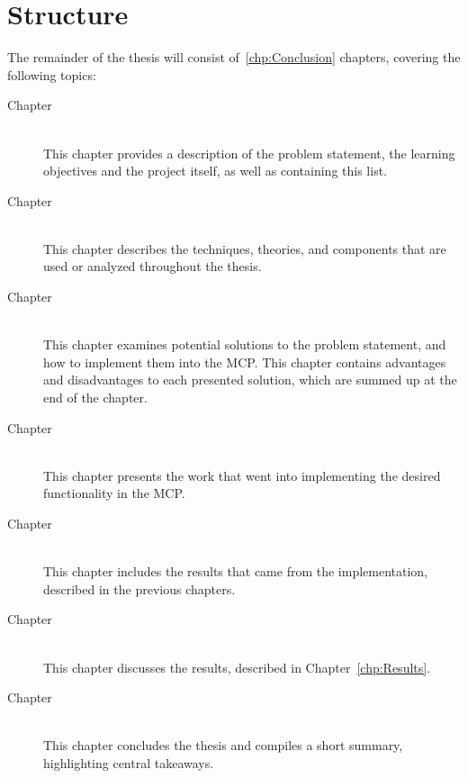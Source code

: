 \section{Structure}
The remainder of the thesis will consist of~\ref{chp:Conclusion} chapters, covering the following topics:
\begin{description}
	\item[Chapter ]\ \\
	This chapter provides a description of the problem statement, the learning objectives and the project itself, as well as containing this list.
	\item[Chapter ]\ \\
	This chapter describes the techniques, theories, and components that are used or analyzed throughout the thesis.
	\item[Chapter ]\ \\
	This chapter examines potential solutions to the problem statement, and how to implement them into the MCP. This chapter contains advantages and disadvantages to each presented solution, which are summed up at the end of the chapter.
	\item[Chapter ]\ \\
	This chapter presents the work that went into implementing the desired functionality in the MCP.
	\item[Chapter ]\ \\
	This chapter includes the results that came from the implementation, described in the previous chapters.
	\item[Chapter ]\ \\
	This chapter discusses the results, described in Chapter~\ref{chp:Results}.
	\item[Chapter ]\ \\
	This chapter concludes the thesis and compiles a short summary, highlighting central takeaways.
\end{description}